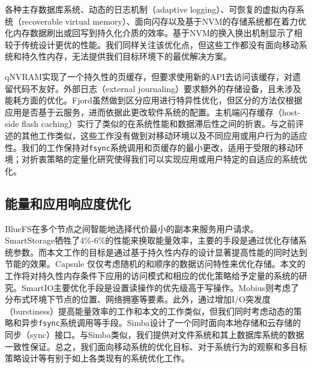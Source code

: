 各种主存数据库系统\cite{DeBrabant:2013:ANA:2556549.2556575,DeWitt:1984:ITM:602259.602261,
Kallman:2008:HHD:1454159.1454211, Ongaro:2011:FCR:2043556.2043560}、动态的日志机制（adaptive logging）\cite{Kim:2010:ALM:1920841.1921023}、可恢复的虚拟内存系统（recoverable virtual memory）\cite{Satyanarayanan:1993:LRV:168619.168631}、面向闪存\cite{Dai:2004:EEL:1031495.1031516,
Kim:2012:GBC:2254756.2254786, Lv:2011:OBM:1989323.1989326}以及基于NVM\cite{Coburn:2013:AMT:2517349.2522724, hitz1994file, 6880383, Wu:1994:ENM:195473.195506}的存储系统都在着力优化内存数据刷出或回写到持久化介质的效率。基于NVM的换入换出机制\cite{6986137}显示了相较于传统设计更优的性能。我们同样关注该优化点，但这些工作都没有面向移动系统和持久性内存，无法提供我们目标环境下的最优解决方案。

qNVRAM\cite{183627}实现了一个持久性的页缓存，但要求使用新的API去访问该缓存，对遗留代码不友好。外部日志（external journaling）\cite{Jeong:2013:ISO:2535461.2535499}要求额外的存储设备，且未涉及能耗方面的优化。Fjord\cite{6558430}虽然做到区分应用进行特异性优化，但区分的方法仅根据应用是否基于云服务，进而依据此更改软件系统的配置。主机端闪存缓存（host-side flash caching）\cite{koller2013write}实行了类似的在系统性能和数据滞后性之间的折衷。与之前评述的其他工作类似，这些工作没有做到对移动环境以及不同应用或用户行为的适应性。我们的工作保持对\texttt{fsync}系统调用和页缓存的最小更改，适用于受限的移动环境；对折衷策略的定量化研究使得我们可以实现应用或用户特定的自适应的系统优化。

\subsection{能量和应用响应度优化}
BlueFS\cite{Nightingale:2004:ESF:1251254.1251279}在多个节点之间智能地选择代价最小的副本来服务用户请求。SmartStorage\cite{Nguyen:2013:SSE:2493432.2493505}牺牲了4\%-6\%的性能来换取能量效率，主要的手段是通过优化存储系统参数。而本文工作的目标是通过基于持久性内存的设计显著提高性能的同时达到节能的效果。Capsule\cite{Mathur:2006:CEO:1182807.1182827} 仅仅考虑随机的和顺序的数据访问特性来优化存储。本文的工作将对持久性内存条件下应用的访问模式和相应的优化策略给予定量的系统的研究。SmartIO\cite{Nguyen:2014:ISR:2638728.2638841}主要优化手段是设置读操作的优先级高于写操作。Mobius\cite{Chun:2012:MUM:2307636.2307650}则考虑了分布式环境下节点的位置、网络拥塞等要素。此外，通过增加I/O突发度（burstiness）提高能量效率的工作\cite{Papa:2003:EET, Weissel:2002:CIN:844128.844140}和本文的工作类似，但我们同时考虑动态的策略和异步\texttt{fsync}系统调用等手段。Simba\cite{188466}设计了一个同时面向本地存储和云存储的同步（sync）接口。与Simba类似，我们提供对文件系统和其上数据库系统的数据一致性保证。总之，我们面向移动系统的优化目标、对于系统行为的观察和多目标策略设计等有别于如上各类现有的系统优化工作。


